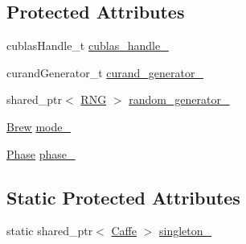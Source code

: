 \subsection*{Protected Attributes}
\begin{DoxyCompactItemize}
\item 
cublas\+Handle\+\_\+t \hyperlink{classcaffe_1_1_caffe_a5fb5298203759722a061644b508ddaeb}{cublas\+\_\+handle\+\_\+}
\item 
curand\+Generator\+\_\+t \hyperlink{classcaffe_1_1_caffe_a0d920ccea7282d5d88335847c0e9ca9e}{curand\+\_\+generator\+\_\+}
\item 
shared\+\_\+ptr$<$ \hyperlink{classcaffe_1_1_caffe_1_1_r_n_g}{R\+N\+G} $>$ \hyperlink{classcaffe_1_1_caffe_a0c1d6159f6add0ae470af9a09836d979}{random\+\_\+generator\+\_\+}
\item 
\hyperlink{classcaffe_1_1_caffe_af8f607248c1f212be1f6f1c988d80e4e}{Brew} \hyperlink{classcaffe_1_1_caffe_aef998c6b69827060630e21a8ccf8884e}{mode\+\_\+}
\item 
\hyperlink{classcaffe_1_1_caffe_ad2993dccc4a615c39259ed7f0d0e24e9}{Phase} \hyperlink{classcaffe_1_1_caffe_ad919ccd26b71547e009bac6debfcc05a}{phase\+\_\+}
\end{DoxyCompactItemize}
\subsection*{Static Protected Attributes}
\begin{DoxyCompactItemize}
\item 
static shared\+\_\+ptr$<$ \hyperlink{classcaffe_1_1_caffe}{Caffe} $>$ \hyperlink{classcaffe_1_1_caffe_a74e06bec4b81b15e2064a216f33467b6}{singleton\+\_\+}
\end{DoxyCompactItemize}


